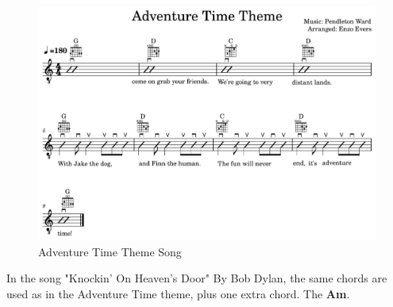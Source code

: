 \begin{figure}[h]
	\centering
	\includegraphics[width=\textwidth]{../../MuseScore/Guitar/GuitarAdventureTimeTheme.png}
	\caption{Adventure Time Theme Song}
	\label{fig:guitar_adventure_time}
\end{figure}

\newpage

In the song "Knockin' On Heaven's Door" By Bob Dylan, the same chords are used as in the Adventure Time theme, plus one extra chord. The \textbf{Am}.

